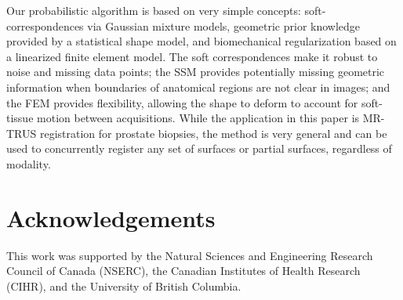 \documentclass[journal]{IEEEtran}
\begin{document}
Our probabilistic algorithm is based on very simple concepts: soft-correspondences via Gaussian mixture models, geometric prior knowledge provided by a statistical shape model, and biomechanical regularization based on a linearized finite element model.  The soft correspondences make it robust to noise and missing data points; the SSM provides potentially missing geometric information when boundaries of anatomical regions are not clear in images; and the FEM provides flexibility, allowing the shape to deform to account for soft-tissue motion between acquisitions.  While the application in this paper is MR-TRUS registration for prostate biopsies, the method is very general and can be used to concurrently register any set of surfaces or partial surfaces, regardless of modality.

\section*{Acknowledgements}
This work was supported by the Natural Sciences and Engineering Research Council of Canada (NSERC), the Canadian Institutes of Health Research (CIHR), and the University of British Columbia.
\appendices
\end{document}
